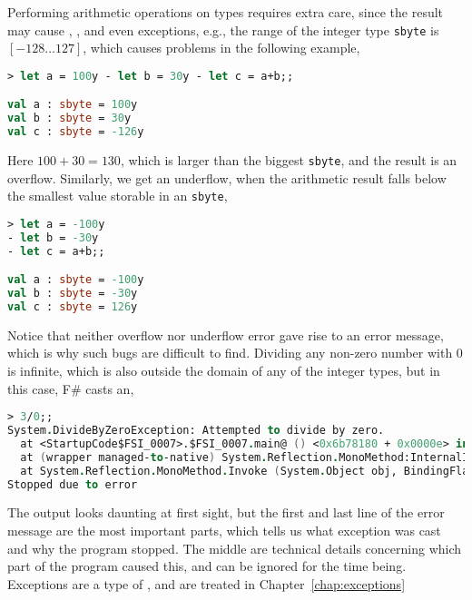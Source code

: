 Performing arithmetic operations on  types requires extra care, since the result may cause , , and even exceptions, e.g., the range of the integer type \lstinline|sbyte| is $[-128\ldots 127]$, which causes problems in the following example,
\begin{lstlisting}[language=fsharp,caption={fsharpi},label=overflow]
  > let a = 100y - let b = 30y - let c = a+b;;

val a : sbyte = 100y
val b : sbyte = 30y
val c : sbyte = -126y
\end{lstlisting}
Here $100+30=130$, which is larger than the biggest \lstinline|sbyte|, and the result is an overflow. Similarly, we get an underflow, when the arithmetic result falls below the smallest value storable in an \lstinline|sbyte|,
\begin{lstlisting}[language=fsharp,caption={fsharpi}]
> let a = -100y  
- let b = -30y  
- let c = a+b;;

val a : sbyte = -100y
val b : sbyte = -30y
val c : sbyte = 126y
\end{lstlisting}
Notice that neither overflow nor underflow error gave rise to an error message, which is why such bugs are difficult to find. 
 Dividing any non-zero number with 0 is infinite, which is also outside the domain of any of the integer types, but in this case, F\# casts an,
\begin{lstlisting}[language=fsharp,caption={fsharpi}]
> 3/0;; 
System.DivideByZeroException: Attempted to divide by zero.
  at <StartupCode$FSI_0007>.$FSI_0007.main@ () <0x6b78180 + 0x0000e> in <filename unknown>:0 
  at (wrapper managed-to-native) System.Reflection.MonoMethod:InternalInvoke (System.Reflection.MonoMethod,object,object[],System.Exception&)
  at System.Reflection.MonoMethod.Invoke (System.Object obj, BindingFlags invokeAttr, System.Reflection.Binder binder, System.Object[] parameters, System.Globalization.CultureInfo culture) <0x1a55ba0 + 0x000a1> in <filename unknown>:0 
Stopped due to error
\end{lstlisting}
The output looks daunting at first sight, but the first and last line of the error message are the most important parts, which tells us what exception was cast and why the program stopped. The middle are technical details concerning which part of the program caused this, and can be ignored for the time being. Exceptions are a type of , and are treated in Chapter~\ref{chap:exceptions}

